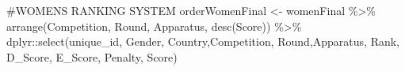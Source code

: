 \documentclass[
  letterpaper,
  DIV=11,
  numbers=noendperiod]{scrartcl}
\newenvironment{Shaded}{\begin{snugshade}}{\end{snugshade}}
\newcommand{\CommentTok}[1]{\textcolor[rgb]{0.37,0.37,0.37}{#1}}
\newcommand{\ControlFlowTok}[1]{\textcolor[rgb]{0.00,0.23,0.31}{#1}}
\newcommand{\DecValTok}[1]{\textcolor[rgb]{0.68,0.00,0.00}{#1}}
\newcommand{\FunctionTok}[1]{\textcolor[rgb]{0.28,0.35,0.67}{#1}}
\newcommand{\NormalTok}[1]{\textcolor[rgb]{0.00,0.23,0.31}{#1}}
\newcommand{\OtherTok}[1]{\textcolor[rgb]{0.00,0.23,0.31}{#1}}
\newcommand{\SpecialCharTok}[1]{\textcolor[rgb]{0.37,0.37,0.37}{#1}}
\begin{document}
\begin{Shaded}
\end{Shaded}

\begin{Shaded}
\begin{Highlighting}[]
\CommentTok{\#WOMENS RANKING SYSTEM}
\NormalTok{orderWomenFinal }\OtherTok{\textless{}{-}}\NormalTok{ womenFinal }\SpecialCharTok{\%\textgreater{}\%} 
  \FunctionTok{arrange}\NormalTok{(Competition, Round, Apparatus, }\FunctionTok{desc}\NormalTok{(Score)) }\SpecialCharTok{\%\textgreater{}\%} 
\NormalTok{  dplyr}\SpecialCharTok{::}\FunctionTok{select}\NormalTok{(unique\_id, Gender, Country,Competition, Round,Apparatus, Rank, D\_Score, E\_Score, Penalty, Score)}
\end{Highlighting}
\end{Shaded}
\end{document}
